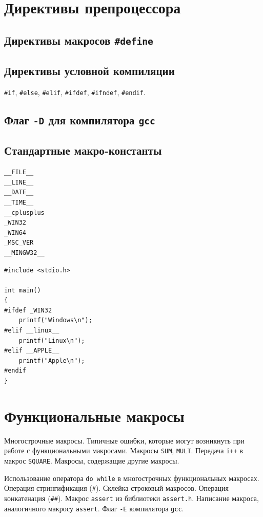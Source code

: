\documentclass[10pt]{article}
\begin{document}
\newpage
\section*{Директивы препроцессора}

\subsection*{Директивы макросов \texttt{\#define}}

\subsection*{Директивы условной компиляции}
\texttt{\#if}, \texttt{\#else}, \texttt{\#elif}, 
\texttt{\#ifdef}, \texttt{\#ifndef}, \texttt{\#endif}.


\subsection*{Флаг \texttt{-D} для компилятора \texttt{gcc}}

\subsection*{Стандартные макро-константы}
\begin{verbatim}
__FILE__
__LINE__
__DATE__
__TIME__
__cplusplus
_WIN32
_WIN64
_MSC_VER
__MINGW32__
\end{verbatim}

\begin{lstlisting}
#include <stdio.h>

int main()
{
#ifdef _WIN32
    printf("Windows\n");
#elif __linux__
    printf("Linux\n");
#elif __APPLE__
    printf("Apple\n");
#endif
}
\end{lstlisting}


\newpage
\section*{Функциональные макросы}

Многострочные макросы. Типичные ошибки, которые
могут возникнуть при работе с функциональными макросами. 
Макросы \texttt{SUM}, \texttt{MULT}. Передача \texttt{i++} в макрос \texttt{SQUARE}.
Макросы, содержащие другие макросы.

Использование оператора \texttt{do while} в
многострочных функциональных макросах. Операция стрингификация (\texttt{\#}). Склейка строковый макросов. Операция конкатенация (\texttt{\#\#}).
Макрос \texttt{assert} из библиотеки \texttt{assert.h}. Написание макроса, аналогичного макросу \texttt{assert}. Флаг \texttt{-E} компилятора \texttt{gcc}.\\
\end{document}
